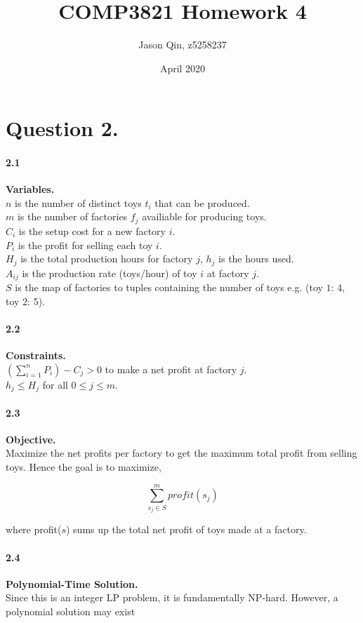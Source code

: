 \documentclass{article}
\title{COMP3821 Homework 4}
\author{Jason Qin, z5258237}
\date{April 2020}
\begin{document}
\maketitle

\section*{Question 2.}
\paragraph{2.1} \textbf{Variables.} \\

\noindent
$n$ is the number of distinct toys $t_i$ that can be produced. \\
$m$ is the number of factories $f_j$ availiable for producing toys. \\
$C_i$ is the setup cost for a new factory $i$. \\
$P_i$ is the profit for selling each toy $i$. \\
$H_j$ is the total production hours for factory $j$, $h_j$ is the hours used. \\
$A_{ij}$ is the production rate (toys/hour) of toy $i$ at factory $j$. \\
$S$ is the map of factories to tuples containing the number of toys e.g. (toy $1$: 4, toy $2$: 5).

\paragraph*{2.2} \textbf{Constraints.} \\

\noindent
$(\sum_{i=1}^{n}P_i) - C_j > 0$ to make a net profit at factory $j$. \\
$h_j \leq H_j$ for all $0 \leq j \leq m$.

\paragraph*{2.3} \textbf{Objective.} \\

\noindent
Maximize the net profits per factory to get the maximum total profit from selling toys.
Hence the goal is to maximize,

$$\sum_{s_j \in S}^{m} profit(s_j)$$

where profit($s$) sums up
the total net profit of toys made at a factory.

\paragraph*{2.4} \textbf{Polynomial-Time Solution.} \\

\noindent
Since this is an integer LP problem, it is fundamentally NP-hard. However, a polynomial solution may exist
\end{document}
